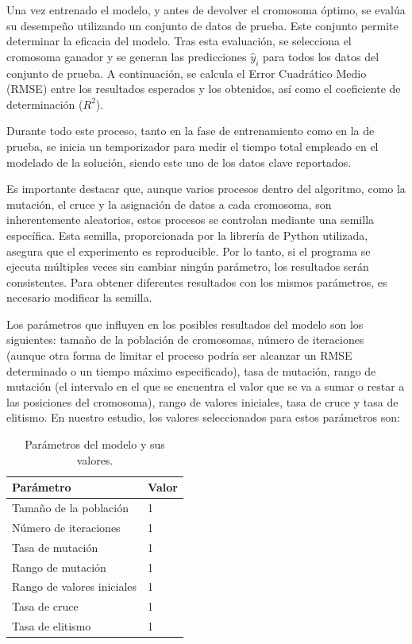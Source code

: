 \documentclass[conference,a4paper]{IEEEtran}
\begin{document}
Una vez entrenado el modelo, y antes de devolver el cromosoma óptimo, se evalúa su desempeño utilizando un conjunto de datos de prueba. Este conjunto permite determinar la eficacia del modelo. Tras esta evaluación, se selecciona el cromosoma ganador y se generan las predicciones \(\hat{y}_i\) para todos los datos del conjunto de prueba. A continuación, se calcula el Error Cuadrático Medio (RMSE) entre los resultados esperados y los obtenidos, así como el coeficiente de determinación (\(R^2\)).

Durante todo este proceso, tanto en la fase de entrenamiento como en la de prueba, se inicia un temporizador para medir el tiempo total empleado en el modelado de la solución, siendo este uno de los datos clave reportados.

Es importante destacar que, aunque varios procesos dentro del algoritmo, como la mutación, el cruce y la asignación de datos a cada cromosoma, son inherentemente aleatorios, estos procesos se controlan mediante una semilla específica. Esta semilla, proporcionada por la librería de Python utilizada, asegura que el experimento es reproducible. Por lo tanto, si el programa se ejecuta múltiples veces sin cambiar ningún parámetro, los resultados serán consistentes. Para obtener diferentes resultados con los mismos parámetros, es necesario modificar la semilla.

Los parámetros que influyen en los posibles resultados del modelo son los siguientes: tamaño de la población de cromosomas, número de iteraciones (aunque otra forma de limitar el proceso podría ser alcanzar un RMSE determinado o un tiempo máximo especificado), tasa de mutación, rango de mutación (el intervalo en el que se encuentra el valor que se va a sumar o restar a las posiciones del cromosoma), rango de valores iniciales, tasa de cruce y tasa de elitismo. En nuestro estudio, los valores seleccionados para estos parámetros son:

\begin{table}[h]
\centering
\caption{Parámetros del modelo y sus valores.}
\label{tab:parametros}
\begin{tabular}{ll}
\toprule
\textbf{Parámetro} & \textbf{Valor} \\
\midrule
Tamaño de la población         & 1 \\
Número de iteraciones          & 1 \\
Tasa de mutación               & 1 \\
Rango de mutación              & 1 \\
Rango de valores iniciales     & 1 \\
Tasa de cruce                  & 1 \\
Tasa de elitismo               & 1 \\
\bottomrule
\end{tabular}
\end{table}
\end{document}
